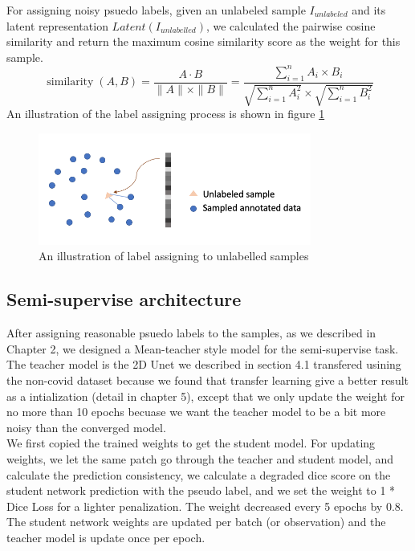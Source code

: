 For assigning noisy psuedo labels, given an unlabeled sample $I_{unlabeled}$ and its latent representation $Latent(I_{unlabelled})$, we calculated the pairwise cosine similarity and return the maximum cosine similarity score as the weight for this sample. 
$$\operatorname{similarity}(A, B)=\frac{A \cdot B}{\|A\| \times\|B\|}=\frac{\sum_{i=1}^{n} A_{i} \times B_{i}}{\sqrt{\sum_{i=1}^{n} A_{i}^{2}} \times \sqrt{\sum_{i=1}^{n} B_{i}^{2}}}$$
An illustration of the label assigning process is shown in figure \ref{fig:semi-label-assign}\\

\begin{figure}
	\centering
	\includegraphics[width=0.8\textwidth]{img/semi-experiment/semi-label-assign}
	\caption{An illustration of label assigning to unlabelled samples}
	\label{fig:semi-label-assign}
\end{figure}

\subsection{Semi-supervise architecture}
After assigning reasonable psuedo labels to the samples, as we described in Chapter 2, we designed a Mean-teacher style model for the semi-supervise task.\\

The teacher model is the 2D Unet we described in section 4.1 transfered usining the non-covid dataset because we found that transfer learning give a better result as a intialization (detail in chapter 5), except that we only update the weight for no more than 10 epochs becuase we want the teacher model to be a bit more noisy than the converged model.\\

We first copied the trained weights to get the student model. For updating weights, we let the same patch go through the teacher and student model, and calculate the prediction consistency, we calculate a degraded dice score on the student network prediction with the pseudo label, and we set the weight to 1 * Dice Loss for a lighter penalization. The weight decreased every 5 epochs by 0.8. The student network weights are updated per batch (or observation) and the teacher model is update once per epoch.                         

